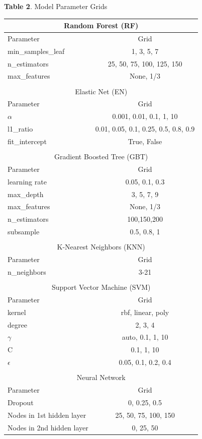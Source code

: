 \documentclass[12pt]{article}
\begin{document}
\begin{table}[ht]{\small \textbf{Table 2}. Model Parameter Grids} \\
\centering
\begin{tabular*}{.7\textwidth}{lc}
\hline\hline
\multicolumn{2}{c}{Random Forest (RF)} \\
\hline
Parameter & Grid \\
\hline
min\_samples\_leaf & 1, 3, 5, 7 \\
n\_estimators & 25, 50, 75, 100, 125, 150 \\
max\_features & None, 1/3  \\
\hline
\multicolumn{2}{c}{} \\
\multicolumn{2}{c}{Elastic Net (EN)} \\
\hline
Parameter & Grid \\
\hline
$\alpha$ & 0.001, 0.01, 0.1, 1, 10 \\
l1\_ratio & 0.01, 0.05, 0.1, 0.25, 0.5, 0.8, 0.9 \\
fit\_intercept & True, False \\
\hline
\multicolumn{2}{c}{} \\
\multicolumn{2}{c}{Gradient Boosted Tree (GBT)} \\
\hline
Parameter & Grid \\
\hline
learning rate & 0.05, 0.1, 0.3 \\
max\_depth & 3, 5, 7, 9 \\
max\_features & None, 1/3 \\
n\_estimators & 100,150,200 \\
subsample & 0.5, 0.8, 1 \\
\hline
\multicolumn{2}{c}{} \\
\multicolumn{2}{c}{K-Nearest Neighbors (KNN)} \\
\hline
Parameter & Grid \\
\hline
n\_neighbors & 3-21 \\
\hline
\multicolumn{2}{c}{} \\
\multicolumn{2}{c}{Support Vector Machine (SVM)} \\
\hline
Parameter & Grid \\
\hline
kernel & rbf, linear, poly \\
degree & 2, 3, 4 \\
$\gamma$ & auto, 0.1, 1, 10 \\
C & 0.1, 1, 10 \\
$\epsilon$ & 0.05, 0.1, 0.2, 0.4 \\
\hline
\multicolumn{2}{c}{} \\
\multicolumn{2}{c}{Neural Network} \\
\hline
Parameter & Grid \\
\hline
Dropout & 0, 0.25, 0.5 \\
Nodes in 1st hidden layer & 25, 50, 75, 100, 150 \\
Nodes in 2nd hidden layer & 0, 25, 50 \\
\hline
\end{tabular*}
\end{table}
\end{document}
